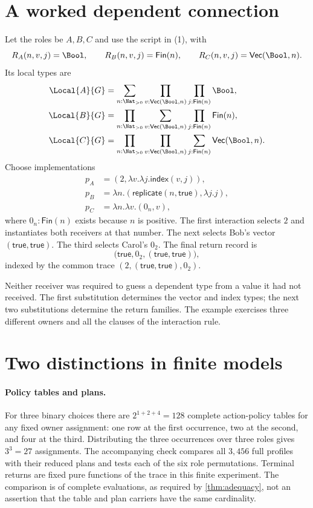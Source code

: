 \section{A worked dependent connection}
\label{app:worked}

Let the roles be $A,B,C$ and use the script in (1), with
\[
 R_A(n,v,j)=\Bool,\qquad R_B(n,v,j)=\mathsf{Fin}(n),
 \qquad R_C(n,v,j)=\mathsf{Vec}(\Bool,n).
\]
Its local types are
\begin{align*}
 \Local{A}{G}
   &=\sum_{n:\Nat_{>0}}\prod_{v:\mathsf{Vec}(\Bool,n)}
                    \prod_{j:\mathsf{Fin}(n)}\Bool,\\
 \Local{B}{G}
   &=\prod_{n:\Nat_{>0}}\sum_{v:\mathsf{Vec}(\Bool,n)}
                    \prod_{j:\mathsf{Fin}(n)}\mathsf{Fin}(n),\\
 \Local{C}{G}
   &=\prod_{n:\Nat_{>0}}\prod_{v:\mathsf{Vec}(\Bool,n)}
                    \sum_{j:\mathsf{Fin}(n)}\mathsf{Vec}(\Bool,n).
\end{align*}
Choose implementations
\begin{align*}
 p_A&=(2,\lambda v.\lambda j.\mathsf{index}(v,j)),\\
 p_B&=\lambda n.(\mathsf{replicate}(n,\mathsf{true}),\lambda j.j),\\
 p_C&=\lambda n.\lambda v.(0_n,v),
\end{align*}
where $0_n:\mathsf{Fin}(n)$ exists because $n$ is positive. The first
interaction selects $2$ and instantiates both receivers at that number.
The next selects Bob's vector $(\mathsf{true},\mathsf{true})$. The third
selects Carol's $0_2$. The final return record is
\[
 \bigl(\mathsf{true},0_2,
       (\mathsf{true},\mathsf{true})\bigr),
\]
indexed by the common trace
$(2,(\mathsf{true},\mathsf{true}),0_2)$.

Neither receiver was required to guess a dependent type from a value it had
not received. The first substitution determines the vector and index types;
the next two substitutions determine the return families. The example
exercises three different owners and all the clauses of the interaction rule.

\section{Two distinctions in finite models}

\paragraph{Policy tables and plans.}
For three binary choices there are $2^{1+2+4}=128$ complete action-policy
tables for any fixed owner assignment: one row at the first occurrence, two
at the second, and four at the third. Distributing the three occurrences over
three roles gives $3^3=27$ assignments. The accompanying check compares all
$3,456$ full profiles with their reduced plans and tests each of the six role
permutations. Terminal returns are fixed pure functions of the trace in this
finite experiment. The comparison is of complete evaluations, as required by
\cref{thm:adequacy}, not an assertion that the table and plan carriers have
the same cardinality.

